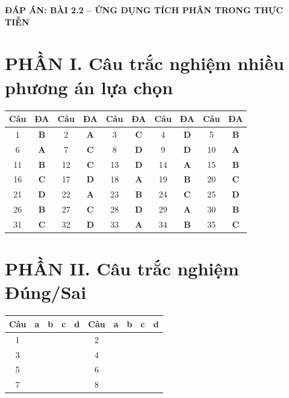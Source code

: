\documentclass[12pt]{article}
\begin{document}
\begin{center}
	\LARGE \textbf{ĐÁP ÁN: BÀI 2.2 -- ỨNG DỤNG TÍCH PHÂN TRONG THỰC TIỄN}
\end{center}

\vspace{0.5cm}

\section*{PHẦN I. Câu trắc nghiệm nhiều phương án lựa chọn}
\begin{center}
	\begin{tabular}{|c|c|c|c|c|c|c|c|c|c|}
		\hline
		\textbf{Câu} & \textbf{ĐA} & \textbf{Câu} & \textbf{ĐA} & \textbf{Câu} & \textbf{ĐA} & \textbf{Câu} & \textbf{ĐA} & \textbf{Câu} & \textbf{ĐA} \\
		\hline
		1 & \textbf{B} & 2 & \textbf{A} & 3 & \textbf{C} & 4 & \textbf{D} & 5 & \textbf{B} \\
		\hline
		6 & \textbf{A} & 7 & \textbf{C} & 8 & \textbf{D} & 9 & \textbf{D} & 10 & \textbf{A} \\
		\hline
		11 & \textbf{B} & 12 & \textbf{C} & 13 & \textbf{D} & 14 & \textbf{A} & 15 & \textbf{B} \\
		\hline
		16 & \textbf{C} & 17 & \textbf{D} & 18 & \textbf{A} & 19 & \textbf{B} & 20 & \textbf{C} \\
		\hline
		21 & \textbf{D} & 22 & \textbf{A} & 23 & \textbf{B} & 24 & \textbf{C} & 25 & \textbf{D} \\
		\hline
		26 & \textbf{B} & 27 & \textbf{C} & 28 & \textbf{D} & 29 & \textbf{A} & 30 & \textbf{B} \\
		\hline
		31 & \textbf{C} & 32 & \textbf{D} & 33 & \textbf{A} & 34 & \textbf{B} & 35 & \textbf{C} \\
		\hline
	\end{tabular}
\end{center}

\vspace{0.5cm}

\section*{PHẦN II. Câu trắc nghiệm Đúng/Sai}
\begin{center}
	\begin{tabular}{|c|c|c|c|c|c|c|c|c|c|}
		\hline
		\textbf{Câu} & \textbf{a} & \textbf{b} & \textbf{c} & \textbf{d} & \textbf{Câu} & \textbf{a} & \textbf{b} & \textbf{c} & \textbf{d} \\
		\hline
		1 & & & & & 2 & & & & \\
		\hline
		3 & & & & & 4 & & & & \\
		\hline
		5 & & & & & 6 & & & & \\
		\hline
		7 & & & & & 8 & & & & \\
		\hline
	\end{tabular}
\end{center}
\end{document}
